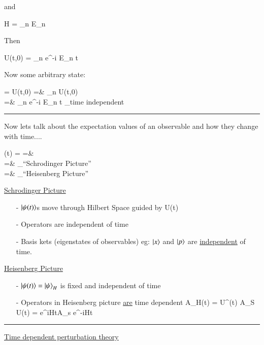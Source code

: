 {and 

\be
H = \sum\limits_{n} E_n 
\ee

Then 

\be
U(t,0) = \sum\limits_{n} e^{-i E_n t} 
\ee


Now some arbitrary state:

\bea
{} = U(t,0) =&  \sum\limits_{n} U(t,0)  \\
                                    =&  \sum\limits_{n}  e^{-i E_n t} _{\textrm{time independent}} \\
\eea


\noindent\rule{\textwidth}{1pt}

Now lets talk about the expectation values of an observable and how they change with time....


\bea
{}(t) =  =& \\
              =& _{\textrm{``Schrodinger Picture''}} \\
              =& _{\textrm{``Heisenberg Picture''}} 
\eea


\underline{Schrodinger Picture}
\begin{itemize}
\item[-] $\ket{\psi(t)}$s move through Hilbert Space guided by U(t)
\item[-] Operators are independent of time
\item[-] Basis kets (eigenstates of observables) eg: $\ket{x}$ and $\ket{p}$ are \underline{independent} of time.
\end{itemize}



\underline{Heisenberg Picture}
\begin{itemize}
\item[-] $\ket{\psi(t)} = \ket{\psi}_H$ is fixed and independent of time
\item[-] {Operators in Heisenberg picture \underline{are} time dependent 
\be
A_H(t) = U^\dagger(t) A_S U(t) = e^{iHt}A_s e^{-iHt}
\ee
}
\end{itemize}

\noindent\rule{\textwidth}{1pt}

\underline{Time dependent perturbation theory}

}
